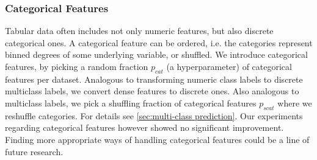 \documentclass{article}
\begin{document}
\subsubsection{Categorical Features}
Tabular data often includes not only numeric features, but also discrete categorical ones. A categorical feature can be ordered, i.e. the categories represent binned degrees of some underlying variable, or shuffled. We introduce categorical features, by picking a random fraction $p_{cat}$ (a hyperparameter) of categorical features per dataset. Analogous to transforming numeric class labels to discrete multiclass labels, we convert dense features to discrete ones. Also analogous to multiclass labels, we pick a shuffling fraction of categorical features $p_{scat}$ where we reshuffle categories. For details see \ref{sec:multi-class prediction}. Our experiments regarding categorical features however showed no significant improvement. Finding more appropriate ways of handling categorical features could be a line of future research.
\end{document}
